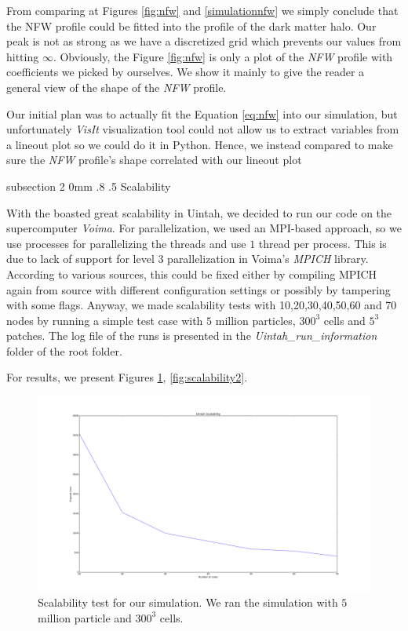 \documentclass[notitlepage, 12pt]{article}
\makeatletter
\renewcommand{\subsection}{\@startsection    %
        {subsection}
        {2}
        {0mm}
        {.8\baselineskip}
        {.5\baselineskip}
        {\bfseries\normalsize}}
\makeatother
\begin{document}
From comparing at Figures \ref{fig:nfw} and \ref{simulationnfw} we simply conclude that the NFW profile could be fitted into the profile of the dark matter 
halo. Our peak is not as strong as we have a discretized grid which prevents our values from hitting $\infty$. Obviously, the Figure \ref{fig:nfw} is only 
a plot of the \emph{NFW} profile with coefficients we picked by ourselves. We show it mainly to give the reader a general view of the shape of the 
\emph{NFW} profile.

Our initial 
plan was to actually fit the Equation \ref{eq:nfw} into our simulation, but unfortunately \emph{VisIt} visualization tool could not allow us to 
extract variables from a lineout plot so we could do it in Python. Hence, we instead compared to make sure the \emph{NFW} profile's shape correlated 
with our lineout plot

\subsection{Scalability}

With the boasted great scalability in Uintah, we decided to run our code on the supercomputer \emph{Voima}. For parallelization, we used an MPI-based 
approach, so we use processes for parallelizing the threads and use $1$ thread per process. This is due to lack of support for level $3$ parallelization in 
Voima's \emph{MPICH} library. According to various sources, this could be fixed either by compiling MPICH again from source with different configuration 
settings or possibly by tampering with some flags. Anyway, we made scalability tests with 10,20,30,40,50,60 and 70 nodes by running a simple test 
case with $5$ million particles, $300^3$ cells and $5^3$ patches. The log file of the runs is presented in the \emph{Uintah\_run\_information} 
folder of the root folder. 

For results, we present Figures \ref{fig:scalability1}, \ref{fig:scalability2}.

\begin{figure}[H]
\centering
\includegraphics[width=\textwidth]{Uintah/scalability.png}
\caption{Scalability test for our simulation. We ran the simulation with $5$ million particle and $300^3$ cells.}
\label{fig:scalability1}
\end{figure}
\end{document}
